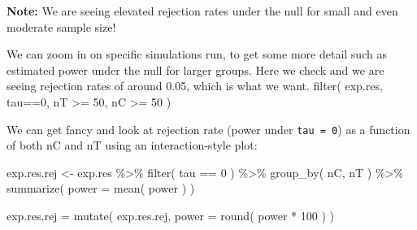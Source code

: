 \documentclass[
]{book}
\newenvironment{Shaded}{\begin{snugshade}}{\end{snugshade}}
\newcommand{\AttributeTok}[1]{\textcolor[rgb]{0.77,0.63,0.00}{#1}}
\newcommand{\DecValTok}[1]{\textcolor[rgb]{0.00,0.00,0.81}{#1}}
\newcommand{\FunctionTok}[1]{\textcolor[rgb]{0.00,0.00,0.00}{#1}}
\newcommand{\NormalTok}[1]{#1}
\newcommand{\OtherTok}[1]{\textcolor[rgb]{0.56,0.35,0.01}{#1}}
\newcommand{\SpecialCharTok}[1]{\textcolor[rgb]{0.00,0.00,0.00}{#1}}
\newcommand{\StringTok}[1]{\textcolor[rgb]{0.31,0.60,0.02}{#1}}
\begin{document}
\textbf{Note:} We are seeing elevated rejection rates under the null for small and even
moderate sample size!

We can zoom in on specific simulations run, to get some more detail
such as estimated power under the null for larger groups. Here we check
and we are seeing rejection rates of around 0.05, which is what we want.
filter( exp.res, tau==0, nT \textgreater= 50, nC \textgreater= 50 )

We can get fancy and look at rejection rate (power under \texttt{tau\ =\ 0}) as a
function of both nC and nT using an interaction-style plot:

\begin{Shaded}
\begin{Highlighting}[]
\NormalTok{exp.res.rej }\OtherTok{\textless{}{-}}\NormalTok{ exp.res }\SpecialCharTok{\%\textgreater{}\%} \FunctionTok{filter}\NormalTok{( tau }\SpecialCharTok{==} \DecValTok{0}\NormalTok{ ) }\SpecialCharTok{\%\textgreater{}\%}
  \FunctionTok{group\_by}\NormalTok{( nC, nT ) }\SpecialCharTok{\%\textgreater{}\%}
  \FunctionTok{summarize}\NormalTok{( }\AttributeTok{power =} \FunctionTok{mean}\NormalTok{( power ) )}

\NormalTok{exp.res.rej }\OtherTok{=} \FunctionTok{mutate}\NormalTok{( exp.res.rej, }\AttributeTok{power =} \FunctionTok{round}\NormalTok{( power }\SpecialCharTok{*} \DecValTok{100}\NormalTok{ ) )}
\end{Highlighting}
\end{Shaded}

\begin{Shaded}
\end{Shaded}
\end{document}
